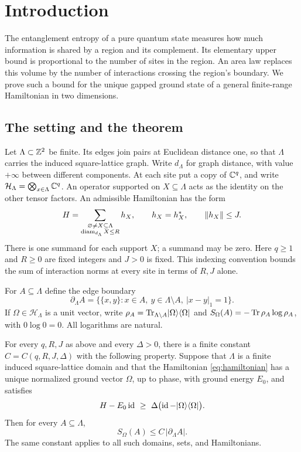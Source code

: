 \section{Introduction}\label{sec:introduction}

The entanglement entropy of a pure quantum state measures how much information
is shared by a region and its complement. Its elementary upper bound is
proportional to the number of sites in the region. An area law replaces this
volume by the number of interactions crossing the region's boundary. We prove
such a bound for the unique gapped ground state of a general finite-range
Hamiltonian in two dimensions.

\subsection{The setting and the theorem}

Let $\Lambda\subset\mathbb Z^2$ be finite. Its edges join pairs at Euclidean distance
one, so that $\Lambda$ carries the induced square-lattice graph. Write
$d_\Lambda$ for graph distance, with value $+\infty$ between different
components. At each site put a copy of $\mathbb C^q$, and write
$\mathcal H_\Lambda=\bigotimes_{x\in\Lambda}\mathbb C^q$.
An operator supported on $X\subseteq\Lambda$ acts as the identity on the other
tensor factors. An admissible Hamiltonian has the form
\begin{equation}\label{eq:hamiltonian}
 H=\sum_{\substack{\varnothing\ne X\subseteq\Lambda\\
                  \operatorname{diam}_{d_\Lambda}X\le R}}h_X,
 \qquad h_X=h_X^*,\qquad \lVert h_X\rVert\le J.
\end{equation}
There is one summand for each support $X$; a summand may be zero.
Here $q\ge1$ and $R\ge0$ are fixed integers and $J>0$ is fixed.
This indexing convention bounds the sum of interaction norms at every site
in terms of $R,J$ alone.

For $A\subseteq\Lambda$ define the edge boundary
\[
 \partial_\Lambda A=
 \{\{x,y\}:x\in A,\ y\in\Lambda\setminus A,\ |x-y|_1=1\}.
\]
If $\Omega\in\mathcal H_\Lambda$ is a unit vector, write
$\rho_A=\operatorname{Tr}_{\Lambda\setminus A}\lvert \Omega\rangle\langle \Omega\rvert$ and
$S_\Omega(A)=-\operatorname{Tr}\rho_A\log\rho_A$, with $0\log0=0$.
All logarithms are natural.

\begin{theorem}\label{thm:area}
For every $q,R,J$ as above and every $\Delta>0$, there is a finite constant
$C=C(q,R,J,\Delta)$ with the following property. Suppose that $\Lambda$ is a
finite induced square-lattice domain and that the Hamiltonian
\eqref{eq:hamiltonian} has a unique normalized ground vector $\Omega$, up to
phase, with ground energy $E_0$, and satisfies
\[
 H-E_0\id\ \ge\ \Delta\bigl(\id-\ket{\Omega}\bra{\Omega}\bigr).
\]
Then for every $A\subseteq\Lambda$,
\begin{equation}\label{eq:area-law}
 S_\Omega(A)\le C\,|\partial_\Lambda A|.
\end{equation}
The same constant applies to all such domains, sets, and Hamiltonians.
\end{theorem}

